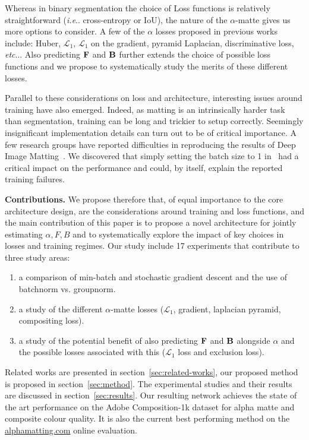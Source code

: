 \documentclass[runningheads]{llncs}
\makeatletter
\DeclareRobustCommand\onedot{\futurelet\@let@token\@onedot}
\def\@onedot{\ifx\@let@token.\else.\null\fi\xspace}
\def\ie{\emph{i.e}\onedot} \def\Ie{\emph{I.e}\onedot}
\def\etc{\emph{etc}\onedot} \def\vs{\emph{vs}\onedot}
\makeatother
\begin{document}
Whereas in binary segmentation the choice of Loss functions is relatively straightforward (\ie
cross-entropy or IoU), the nature of the $\alpha$-matte gives us more options to consider. A few of the $\alpha$ losses proposed in previous
works include: Huber, $\mathcal{L}_1$, $\mathcal{L}_1$ on the gradient, pyramid Laplacian,
discriminative loss, \etc. Also predicting $\mathbf{{{F}}}$ and $\mathbf{{{B}}}$ further extends the
choice of possible loss functions and we propose to systematically study the
merits of these different losses.

Parallel to these considerations on loss and architecture, interesting issues
around training have also emerged. Indeed, as matting is an intrinsically harder
task than segmentation, training can be long and trickier to setup
correctly. Seemingly insignificant implementation details can turn out to be of
critical importance. A few research groups have reported difficulties in
reproducing the results of Deep Image Matting~\cite{foamliu_2020,AlphaGAN,joker316701882_2018}. We discovered that
simply setting the batch size to 1 in~\cite{DeepImageMatting} had a critical impact on the
performance and could, by itself, explain the reported training failures.

{\bf Contributions.} We propose therefore that, of equal importance to the core
architecture design, are the considerations around training and loss functions, and
the main contribution of this paper is to propose a novel architecture for
jointly estimating $\alpha, F, B$ and to systematically explore the impact of
key choices in losses and training regimes. Our study include 17 experiments
that contribute to three study areas:
\begin{enumerate}
    \item a comparison of min-batch and stochastic gradient descent and the use
      of batchnorm vs. groupnorm.
    \item a study of the different $\alpha$-matte losses ($\mathcal{L}_1$, gradient,
      laplacian pyramid, compositing loss).
    \item a study of the potential benefit of also predicting $\mathbf{{{F}}}$ and $\mathbf{{{B}}}$
      alongside $\alpha$ and the possible losses associated with this ($\mathcal{L}_1$
      loss and exclusion loss).
\end{enumerate}

Related works are presented in section~\ref{sec:related-works}, our proposed method is proposed in section~\ref{sec:method}. The experimental studies and their results are discussed in section~\ref{sec:results}. Our resulting network achieves
the state of the art performance on the Adobe Com\-po\-si\-tion-1k dataset for
alpha matte and composite colour quality. It is also the current best performing
method on the \url{alphamatting.com} online evaluation.
\end{document}
